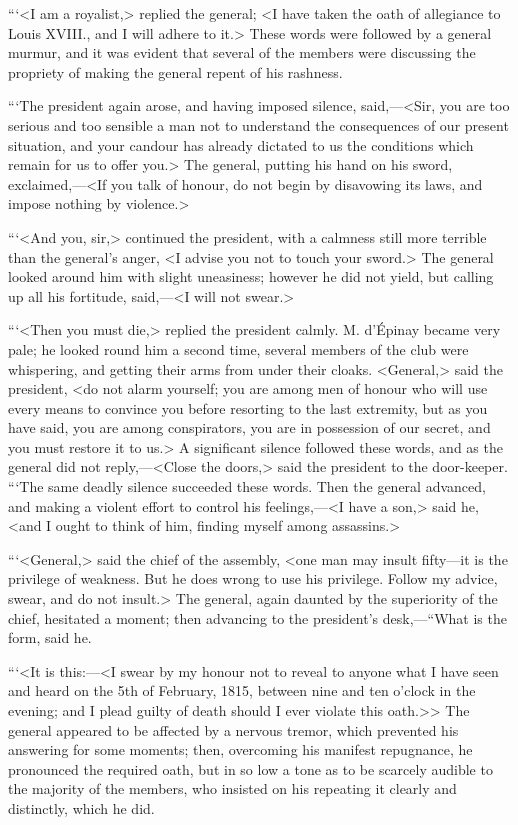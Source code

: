  “‘<I am a royalist,> replied the general; <I have taken the oath of allegiance to Louis XVIII., and I will adhere to it.> These words were followed by a general murmur, and it was evident that several of the members were discussing the propriety of making the general repent of his rashness. 

 “‘The president again arose, and having imposed silence, said,—<Sir, you are too serious and too sensible a man not to understand the consequences of our present situation, and your candour has already dictated to us the conditions which remain for us to offer you.> The general, putting his hand on his sword, exclaimed,—<If you talk of honour, do not begin by disavowing its laws, and impose nothing by violence.> 

 “‘<And you, sir,> continued the president, with a calmness still more terrible than the general's anger, <I advise you not to touch your sword.> The general looked around him with slight uneasiness; however he did not yield, but calling up all his fortitude, said,—<I will not swear.> 

 “‘<Then you must die,> replied the president calmly. M. d'Épinay became very pale; he looked round him a second time, several members of the club were whispering, and getting their arms from under their cloaks. <General,> said the president, <do not alarm yourself; you are among men of honour who will use every means to convince you before resorting to the last extremity, but as you have said, you are among conspirators, you are in possession of our secret, and you must restore it to us.> A significant silence followed these words, and as the general did not reply,—<Close the doors,> said the president to the door-keeper.  “‘The same deadly silence succeeded these words. Then the general advanced, and making a violent effort to control his feelings,—<I have a son,> said he, <and I ought to think of him, finding myself among assassins.> 

 “‘<General,> said the chief of the assembly, <one man may insult fifty—it is the privilege of weakness. But he does wrong to use his privilege. Follow my advice, swear, and do not insult.> The general, again daunted by the superiority of the chief, hesitated a moment; then advancing to the president's desk,—“What is the form, said he. 

 “‘<It is this:—<I swear by my honour not to reveal to anyone what I have seen and heard on the 5th of February, 1815, between nine and ten o'clock in the evening; and I plead guilty of death should I ever violate this oath.>> The general appeared to be affected by a nervous tremor, which prevented his answering for some moments; then, overcoming his manifest repugnance, he pronounced the required oath, but in so low a tone as to be scarcely audible to the majority of the members, who insisted on his repeating it clearly and distinctly, which he did. 

